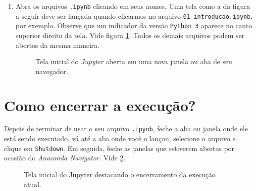 \documentclass[a4paper,12pt]{article}
\begin{document}
\begin{enumerate}
\begin{figure}[h!]
\end{figure}  
\item
  Abra os arquivos \texttt{.ipynb} clicando em seus nomes. Uma tela como
  a da figura a seguir deve ser lançada quando clicarmos no arquivo
  \texttt{01-introducao.ipynb}, por exemplo. Observe que um indicador da versão \texttt{Python 3} aparece no canto superior direito da tela. Vide figura \ref{fig:intro}. Todos os demais arquivos podem ser abertos da mesma maneira. 
  \begin{figure}[h!]
\centering
\caption{\label{fig:intro}Tela inicial do \emph{Jupyter} aberta em uma nova janela ou aba de seu navegador.}
\end{figure}  
\end{enumerate}

\section*{Como encerrar a execução?}

Depois de terminar de usar o seu arquivo \texttt{.ipynb}, feche a aba ou janela onde ele está sendo executado, vá até a aba onde você o lançou, selecione o arquivo e clique em \texttt{Shutdown}. Em seguida, feche as janelas que estiverem abertas por ocasião do \emph{Anaconda Navigator}. Vide \ref{fig:shutdown}.
 \begin{figure}[h!]
\centering
\caption{\label{fig:shutdown}Tela inicial do Jupyter destacando o encerramento da execução atual.}
\end{figure}  
\end{document}
